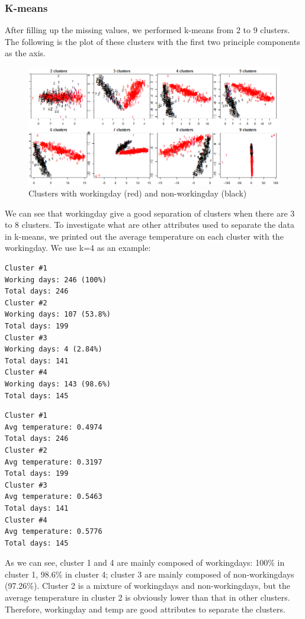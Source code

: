 \documentclass[12pt]{article}
\begin{document}
\subsubsection{K-means}	

After filling up the missing values, we performed k-means from 2 to 9 clusters. The following is the plot of these clusters with the first two principle components as the axis.
	\begin{figure}[H]
		\centering
		\includegraphics[scale=.65]{figures/kmeans_workingday.png}
		\caption{Clusters with workingday (red) and non-workingday (black)}
	\end{figure}

We can see that workingday give a good separation of clusters when there are 3 to 8 clusters. To investigate what are other attributes used to separate the data in k-means, we printed out the average temperature on each cluster with the workingday. We use k=4 as an example: \color{blue}
\begin{multicols}{2}
	\begin{verbatim}
Cluster #1
Working days: 246 (100%)
Total days: 246
Cluster #2
Working days: 107 (53.8%)
Total days: 199
Cluster #3
Working days: 4 (2.84%)
Total days: 141
Cluster #4
Working days: 143 (98.6%)
Total days: 145
	\end{verbatim}
	\columnbreak
	\begin{verbatim}
Cluster #1
Avg temperature: 0.4974
Total days: 246
Cluster #2
Avg temperature: 0.3197
Total days: 199
Cluster #3
Avg temperature: 0.5463
Total days: 141
Cluster #4
Avg temperature: 0.5776
Total days: 145
	\end{verbatim}
\end{multicols} 
\color{black}
As we can see, cluster 1 and 4 are mainly composed of workingdays: 100\% in cluster 1, 98.6\% in cluster 4; cluster 3 are mainly composed of non-workingdays (97.26\%).  Cluster 2 is a mixture of workingdays and non-workingdays, but the average temperature in cluster 2 is obviously lower than that in other clusters. Therefore, workingday and temp are good attributes to separate the clusters.
\end{document}
